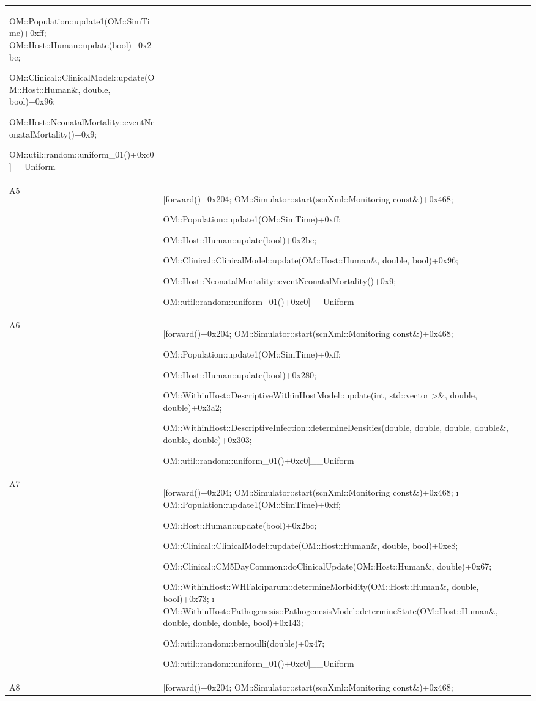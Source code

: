 \documentclass{article}
\begin{document}
{\begin{table}[b!]
\begin{tabularx}{\textwidth}{@{}lX@{}}
  OM::Population::update1(OM::SimTime)+0xff; OM::Host::Human::update(bool)+0x2bc;

   OM::Clinical::ClinicalModel::update(OM::Host::Human\&, double, bool)+0x96; 

   OM::Host::NeonatalMortality::eventNeonatalMortality()+0x9;

    OM::util::random::uniform\_01()+0xc0]\_\_Uniform\\
  A5 & [forward()+0x204; OM::Simulator::start(scnXml::Monitoring const\&)+0x468;

   OM::Population::update1(OM::SimTime)+0xff;

    OM::Host::Human::update(bool)+0x2bc;

    OM::Clinical::ClinicalModel::update(OM::Host::Human\&, double, bool)+0x96;

    OM::Host::NeonatalMortality::eventNeonatalMortality()+0x9;

    OM::util::random::uniform\_01()+0xc0]\_\_Uniform\\
  A6 & [forward()+0x204; OM::Simulator::start(scnXml::Monitoring const\&)+0x468;

   OM::Population::update1(OM::SimTime)+0xff;

   OM::Host::Human::update(bool)+0x280;

   OM::WithinHost::DescriptiveWithinHostModel::update(int, std::vector \textgreater{}\&, double, double)+0x3a2;

   OM::WithinHost::DescriptiveInfection::determineDensities(double, double, double, double\&, double, double)+0x303;

   OM::util::random::uniform\_01()+0xc0]\_\_Uniform\\
   A7 & [forward()+0x204; OM::Simulator::start(scnXml::Monitoring const\&)+0x468;
   ı
	OM::Population::update1(OM::SimTime)+0xff;

	OM::Host::Human::update(bool)+0x2bc;

	OM::Clinical::ClinicalModel::update(OM::Host::Human\&, double, bool)+0xe8;

	OM::Clinical::CM5DayCommon::doClinicalUpdate(OM::Host::Human\&, double)+0x67;

	OM::WithinHost::WHFalciparum::determineMorbidity(OM::Host::Human\&, double, bool)+0x73;
ı
	OM::WithinHost::Pathogenesis::PathogenesisModel::determineState(OM::Host::Human\&, double, double, double, bool)+0x143;

	OM::util::random::bernoulli(double)+0x47;

	OM::util::random::uniform\_01()+0xc0]\_\_Uniform\\
	A8 & [forward()+0x204; OM::Simulator::start(scnXml::Monitoring const\&)+0x468;


\end{tabularx}
\end{table}}
\end{document}
